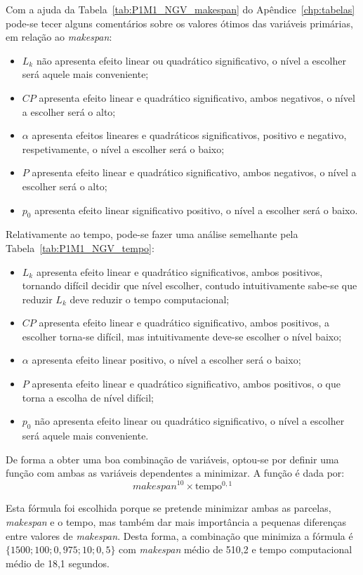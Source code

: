 Com a ajuda da Tabela~\ref{tab:P1M1_NGV_makespan} do Apêndice~\ref{chp:tabelas} pode-se tecer alguns comentários sobre os valores ótimos das variáveis primárias, em relação ao \textit{makespan}:\\
\begin{itemize}
\item $L_{k}$ não apresenta efeito linear ou quadrático significativo, o nível a escolher será aquele mais conveniente;
\item $CP$ apresenta efeito linear e quadrático significativo, ambos negativos, o nível a escolher será o alto;
\item $\alpha$ apresenta efeitos lineares e quadráticos significativos, positivo e negativo, respetivamente, o nível a escolher será o baixo;
\item $P$ apresenta efeito linear e quadrático significativo, ambos negativos, o nível a escolher será o alto;
\item $p_{0}$ apresenta efeito linear significativo positivo, o nível a escolher será o baixo.
\end{itemize}
Relativamente ao tempo, pode-se fazer uma análise semelhante pela Tabela~\ref{tab:P1M1_NGV_tempo}:
\begin{itemize}
\item $L_{k}$ apresenta efeito linear e quadrático significativos, ambos positivos, tornando difícil decidir que nível escolher, contudo intuitivamente sabe-se que reduzir $L_{k}$ deve reduzir o tempo computacional;
\item $CP$ apresenta efeito linear e quadrático significativo, ambos positivos, a escolher torna-se difícil, mas intuitivamente deve-se escolher o nível baixo;
\item $\alpha$ apresenta efeito linear positivo, o nível a escolher será o baixo;
\item $P$ apresenta efeito linear e quadrático significativo, ambos positivos, o que torna a escolha de nível difícil;
\item $p_{0}$ não apresenta efeito linear ou quadrático significativo, o nível a escolher será aquele mais conveniente.
\end{itemize}

De forma a obter uma boa combinação de variáveis, optou-se por definir uma função com ambas as variáveis dependentes a minimizar. A função é dada por:\\
$$\textit{makespan}^{10}\times \text{tempo}^{0,1}$$

Esta fórmula foi escolhida porque se pretende minimizar ambas as parcelas, \textit{makespan} e o tempo, mas também dar mais importância a pequenas diferenças entre valores de \textit{makespan}. Desta forma, a combinação que minimiza a fórmula é $\{1500; 100; 0,975; 10; 0,5\}$ com \textit{makespan} médio de 510,2 e tempo computacional médio de 18,1 segundos.\\

